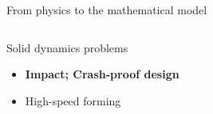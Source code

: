\begin{withoutheadline}
  \begin{frame}{From physics to the mathematical model}
    
  \vspace{-0.6cm}
  \begin{overprint}
    \begin{columns}
      \begin{column}{0.45\textwidth}
        \begin{block}{Solid dynamics problems}
          \begin{itemize}
          \item[] \textbf{Impact; Crash-proof design}
          \item[] High-speed forming
          \end{itemize}
        \end{block}
      \end{column}
      
      \begin{column}{0.55\textwidth}
      \end{column}
    \end{columns}
    
    \begin{figure}[ht]
      \centering
    \end{figure}
    

\end{overprint}
\end{frame}
\end{withoutheadline}
